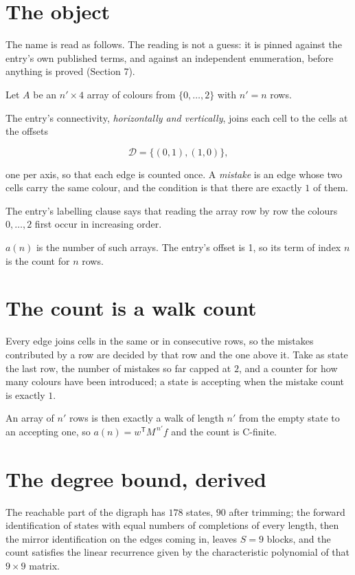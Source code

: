 \documentclass[11pt]{article}
\theoremstyle{definition}
\begin{document}
\section{The object}

The name is read as follows. The reading is not a guess: it is pinned against the entry's own published terms, and against an independent enumeration, before anything is proved (Section 7).

Let $A$ be an $n' \times 4$ array of colours from $\{0,\dots,2\}$ with $n' = n$ rows.

The entry's connectivity, {\itshape horizontally and vertically}, joins each cell to the cells at the offsets

\[\mathcal{D} = \{(0,1), (1,0)\},\]

one per axis, so that each edge is counted once. A {\itshape mistake} is an edge whose two cells carry the same colour, and the condition is that there are exactly $1$ of them.

The entry's labelling clause says that reading the array row by row the colours $0,\dots,2$ first occur in increasing order.

$a(n)$ is the number of such arrays. The entry's offset is 1, so its term of index $n$ is the count for $n$ rows.

\section{The count is a walk count}

Every edge joins cells in the same or in consecutive rows, so the mistakes contributed by a row are decided by that row and the one above it. Take as state the last row, the number of mistakes so far capped at $2$, and a counter for how many colours have been introduced; a state is accepting when the mistake count is exactly $1$.

An array of $n'$ rows is then exactly a walk of length $n'$ from the empty state to an accepting one, so $a(n) = w^{\mathsf T}M^{\,n'}f$ and the count is C-finite.

\section{The degree bound, derived}

The reachable part of the digraph has $178$ states, $90$ after trimming; the forward identification of states with equal numbers of completions of every length, then the mirror identification on the edges coming in, leaves $S = 9$ blocks, and the count satisfies the linear recurrence given by the characteristic polynomial of that $9\times9$ matrix.
\end{document}
